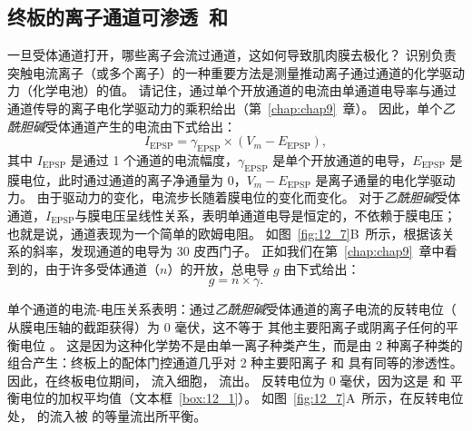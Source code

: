 \subsection{终板的离子通道可渗透~和~}

一旦受体通道打开，哪些离子会流过通道，这如何导致肌肉膜去极化？
识别负责突触电流离子（或多个离子）的一种重要方法是测量推动离子通过通道的化学驱动力（化学电池）的值。
请记住，通过单个开放通道的电流由单通道电导率与通过通道传导的离子电化学驱动力的乘积给出（第~\ref{chap:chap9}~章）。
因此，单个\textit{乙酰胆碱}受体通道产生的电流由下式给出：
%
\begin{equation}
	I_{\text{EPSP}} = \gamma_{\text{EPSP}}\times (V_m - E_{\text{EPSP}}),
\end{equation}
%
其中 $I_{\text{EPSP}}$ 是通过 1 个通道的电流幅度，$\gamma_{\text{EPSP}}$ 是单个开放通道的电导，$ E_{\text{EPSP}} $ 是膜电位，此时通过通道的离子净通量为 0，$V_m - E_{\text{EPSP}}$ 是离子通量的电化学驱动力。
由于驱动力的变化，电流步长随着膜电位的变化而变化。 
对于\textit{乙酰胆碱}受体通道，$I_{\text{EPSP}}$与膜电压呈线性关系，表明单通道电导是恒定的，不依赖于膜电压；
也就是说，通道表现为一个简单的欧姆电阻。
如图~\ref{fig:12_7}B~所示，根据该关系的斜率，发现通道的电导为 30 皮西门子。
正如我们在第~\ref{chap:chap9}~章中看到的，由于许多受体通道（$n$）的开放，总电导 $g$ 由下式给出：
%
\begin{equation}
	g = n \times \gamma.
\end{equation}


单个通道的电流-电压关系表明：通过\textit{乙酰胆碱}受体通道的离子电流的反转电位（ 从膜电压轴的截距获得）为 0 毫伏，这不等于  其他主要阳离子或阴离子任何的平衡电位 。
这是因为这种化学势不是由单一离子种类产生，而是由 2 种离子种类的组合产生：终板上的配体门控通道几乎对 2 种主要阳离子  和  具有同等的渗透性。
因此，在终板电位期间， 流入细胞， 流出。
反转电位为 0 毫伏，因为这是  和  平衡电位的加权平均值（文本框~\ref{box:12_1}）。
如图~\ref{fig:12_7}A~所示，在反转电位处， 的流入被  的等量流出所平衡。


